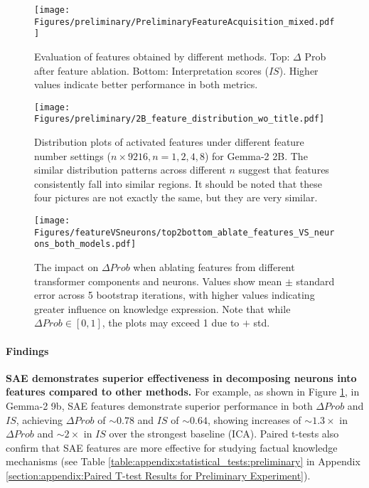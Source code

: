 \begin{figure}
    \centering
    \texttt{[image: Figures/preliminary/PreliminaryFeatureAcquisition\_mixed.pdf]}
\caption{Evaluation of features obtained by different methods. Top: $\Delta$ Prob after feature ablation. Bottom: Interpretation scores ($IS$). Higher values indicate better performance in both metrics.}
    \label{fig:Preliminary: Feature Acquisition:compare features}
\end{figure}
\begin{figure*}
    \centering
    \texttt{[image: Figures/preliminary/2B\_feature\_distribution\_wo\_title.pdf]}
\caption{Distribution plots of activated features under different feature number settings ($n\times 9216, n=1,2,4,8$) for Gemma-2 2B. 
The similar distribution patterns across different $n$ suggest that features consistently fall into similar regions. It should be noted that these four pictures are not exactly the same, but they are very similar.}
    \label{fig:Preliminary: Feature splitting}
\end{figure*}
\begin{figure*}
    \centering
    \texttt{[image: Figures/featureVSneurons/top2bottom\_ablate\_features\_VS\_neurons\_both\_models.pdf]}
\caption{The impact on $\Delta Prob$ when ablating features from different transformer components and neurons. Values show mean $\pm$ standard error across 5 bootstrap iterations, with higher values indicating greater influence on knowledge expression. Note that while $\Delta Prob \in [0,1]$, the plots may exceed 1 due to $+$ std.}
\label{fig:top2bottom_ablate_features_VS_neurons_both_models}
\end{figure*}


\paragraph{Findings}
\textbf{SAE demonstrates superior effectiveness in decomposing neurons into features compared to other methods.} For example, as shown in Figure \ref{fig:Preliminary: Feature Acquisition:compare features}, in Gemma-2 9b, SAE features demonstrate superior performance in both $\Delta Prob$ and $IS$, achieving $\Delta Prob$ of $\sim0.78$ and $IS$ of $\sim0.64$, showing increases of $\sim1.3\times$ in $\Delta Prob$ and $\sim2\times$ in $IS$ over the strongest baseline (ICA). Paired t-tests also confirm that SAE features are more effective for studying factual knowledge mechanisms (see Table \ref{table:appendix:statistical_tests:preliminary} in Appendix \ref{section:appendix:Paired T-test Results for Preliminary Experiment}).

